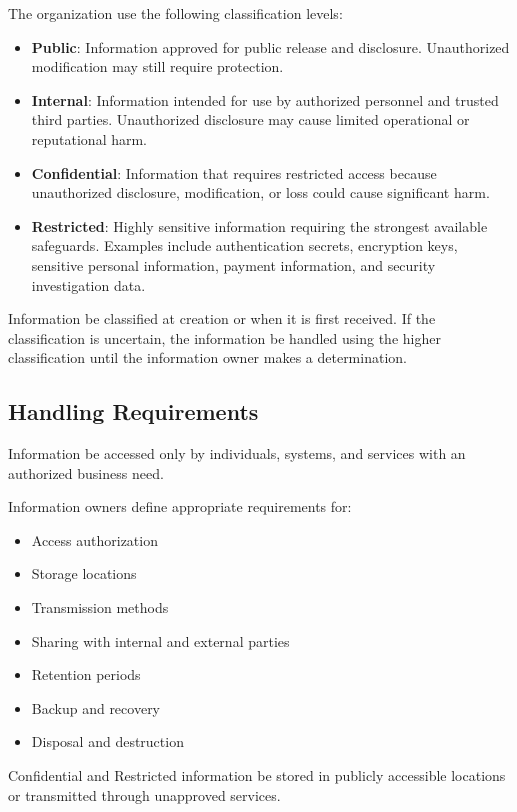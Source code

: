 The organization \should{} use the following classification levels:
\begin{itemize}
    \item \textbf{Public}: Information approved for public release and disclosure. Unauthorized modification may still require protection.
    \item \textbf{Internal}: Information intended for use by authorized personnel and trusted third parties. Unauthorized disclosure may cause limited operational or reputational harm.
    \item \textbf{Confidential}: Information that requires restricted access because unauthorized disclosure, modification, or loss could cause significant harm.
    \item \textbf{Restricted}: Highly sensitive information requiring the strongest available safeguards. Examples include authentication secrets, encryption keys, sensitive personal information, payment information, and security investigation data.
\end{itemize}

Information \must{} be classified at creation or when it is first received. If the classification is uncertain, the information \must{} be handled using the higher classification until the information owner makes a determination.

\subsection{Handling Requirements}

Information \must{} be accessed only by individuals, systems, and services with an authorized business need.

Information owners \must{} define appropriate requirements for:
\begin{itemize}
    \item Access authorization
    \item Storage locations
    \item Transmission methods
    \item Sharing with internal and external parties
    \item Retention periods
    \item Backup and recovery
    \item Disposal and destruction
\end{itemize}

Confidential and Restricted information \mustnot{} be stored in publicly accessible locations or transmitted through unapproved services.


